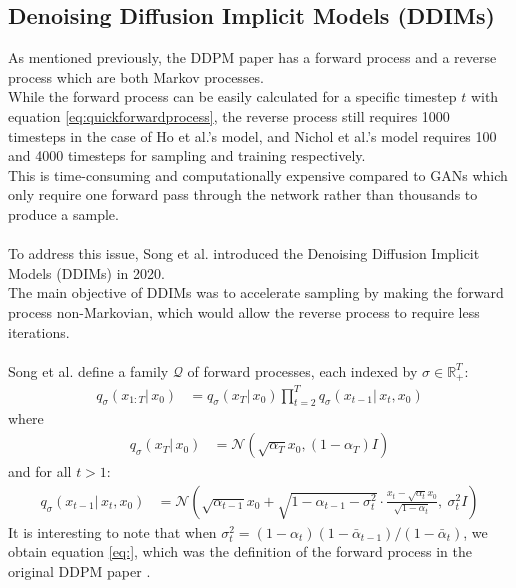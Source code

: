 \documentclass[twoside]{article}
\numberwithin{equation}{section}
\numberwithin{figure}{section}
\begin{document}
\newpage

\subsection{Denoising Diffusion Implicit Models (DDIMs)}
As mentioned previously, the DDPM paper \cite{ho2020denoising} has a forward process and a reverse process which are both Markov processes. \\
While the forward process can be easily calculated for a specific timestep $t$ with equation \ref{eq:quickforwardprocess}, the reverse process still requires 1000 timesteps in the case of Ho et al.'s \cite{ho2020denoising} model, and Nichol et al.'s model requires 100 and 4000 timesteps for sampling and training respectively. \cite{nichol2021improved} \\
This is time-consuming and computationally expensive compared to GANs which only require one forward pass through the network rather than thousands to produce a sample. \cite{song2022denoising}
\\\\
To address this issue, Song et al. \cite{song2022denoising} introduced the Denoising Diffusion Implicit Models (DDIMs) in 2020. \\
The main objective of DDIMs was to accelerate sampling by making the forward process non-Markovian, which would allow the reverse process to require less iterations. \cite{song2022denoising}
\\\\
Song et al. \cite{song2022denoising} define a family $\mathcal{Q}$ of forward processes, each indexed by $\sigma \in \mathbb{R}^T_+$:
\begin{align}
  q_{\sigma}(x_{1:T}| \, x_0) &= q_{\sigma}(x_T | \, x_0) \prod_{t=2}^{T} q_{\sigma}(x_{t-1}| \, x_t, x_0)
\end{align}
where
\begin{align}
  q_{\sigma}(x_T | \, x_0) &= \mathcal{N}(\sqrt{\alpha_T} x_0, (1 - \alpha_T) I)
\end{align}
and for all $t > 1$:
\begin{align}
  q_{\sigma}(x_{t-1} | \, x_t, x_0) &= \mathcal{N}\left( \sqrt{\alpha_{t-1}} x_0 + \sqrt{1 - \alpha_{t-1} - \sigma_t^2} \cdot \frac{x_t - \sqrt{\alpha_t} x_0}{\sqrt{1 - \alpha_t}}, \: \sigma_t^2 I \right)
\end{align}
It is interesting to note that when $\sigma_t^2 = (1 - \alpha_t)(1 - \bar{\alpha}_{t-1})/(1 - \bar{\alpha}_t)$, we obtain equation \ref{eq:}, which was the definition of the forward process in the original DDPM paper \cite{ho2020denoising, song2022denoising}. \\
\end{document}
